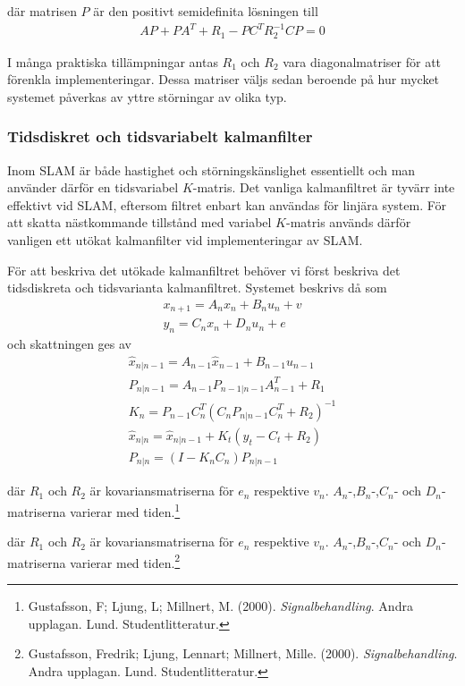 \documentclass[a4paper,12pt,fleqn]{article}
\begin{document}
där matrisen $P$ är den positivt semidefinita lösningen till 
\begin{gather}
AP + PA^{T} + R_{1} - PC^{T}R_{2}^{-1}CP = 0
\end{gather}

I många praktiska tillämpningar antas $R_{1}$ och $R_{2}$ vara diagonalmatriser för att förenkla implementeringar. Dessa matriser väljs sedan beroende på hur mycket systemet påverkas av yttre störningar av olika typ. 

\subsubsection{Tidsdiskret och tidsvariabelt kalmanfilter} Inom SLAM är både hastighet och störningskänslighet essentiellt och man använder därför en tidsvariabel $K$-matris. Det vanliga kalmanfiltret är tyvärr inte effektivt vid SLAM, eftersom filtret enbart kan användas för linjära system. För att skatta nästkommande tillstånd med variabel $K$-matris används därför vanligen ett utökat kalmanfilter vid implementeringar av SLAM. 

För att beskriva det utökade kalmanfiltret behöver vi först beskriva det tidsdiskreta och tidsvarianta kalmanfiltret. Systemet beskrivs då som 
\begin{gather}
x_{n+1} = A_nx_n + B_nu_n+v \\
y_n = C_nx_n + D_nu_n + e
\end{gather}
och skattningen ges av
\begin{gather}
	\hat{x}_{n|n-1} = A_{n-1}\hat{x}_{n-1} + B_{n-1}u_{n-1} \\
	P_{n|n-1}=A_{n-1}P_{n-1|n-1}A^T_{n-1}+R_1 \\
	K_n = P_{n-1}C_{n}^T(C_{n}P_{n|n-1}C_{n}^T+R_2)^{-1}	\\
	\hat{x}_{n|n} = \hat{x}_{n|n-1} + K_{t}(y_{t}-C_{t}+R_{2})\\
	P_{n|n}=(I-K_nC_n)P_{n|n-1}	
\end{gather}

där $R_1$ och $R_2$ är kovariansmatriserna för $e_n$ respektive $v_n$. $A_n$-,$B_n$-,$C_n$- och $D_n$-matriserna varierar med tiden.\footnote{Gustafsson, F; Ljung, L; Millnert, M. (2000). \textit{Signalbehandling}. Andra upplagan. Lund. Studentlitteratur.}

där $R_1$ och $R_2$ är kovariansmatriserna för $e_n$ respektive $v_n$. $A_n$-,$B_n$-,$C_n$- och $D_n$-matriserna varierar med tiden.\footnote{Gustafsson, Fredrik; Ljung, Lennart; Millnert, Mille. (2000). \textit{Signalbehandling}. Andra upplagan. Lund. Studentlitteratur.}
\end{document}
